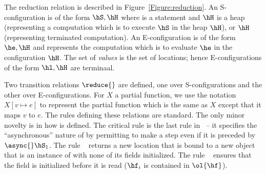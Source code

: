 
The reduction relation is described in
Figure~\ref{Figure:reduction}. An S-configuration is of the form
$\hS,\hH$ where \hS{} is a statement and $\hH$ is a heap (representing a
computation which is to execute $\hS$ in the heap $\hH$), or $\hH$
(representing terminated computation). An
E-configuration is of the form $\he,\hH$ and represents the
computation which is to evaluate $\he$ in the configuration $\hH$. The
set of {\em values} is the set of locations; hence E-configurations of
the form $\hl,\hH$ are terminaal.

Two transition relations $\reduce{}$ are defined, one over S-configurations and
the other over E-configurations.
For $X$ a partial function, we use the notation $X[v \mapsto
  e]$ to represent the partial function which is the same as $X$
except that it maps $v$ to $e$.
The rules defining these relations are
standard.
The only minor novelty is in how \async{} is defined. The
critical rule is the last rule in~  -- it specifies the
``asynchronous'' nature of \async{} by permitting \hS{} to make a step
even if it is preceded by $\async{} \hS_1$.
%
The rule ~ returns a new location that is bound to a new
object that is an instance of \hC{} with none of its fields initialized.
%
The rule
~ ensures that the field is initialized before it is
read ($\hf_i$ is contained in $\ol{\hf}$).

